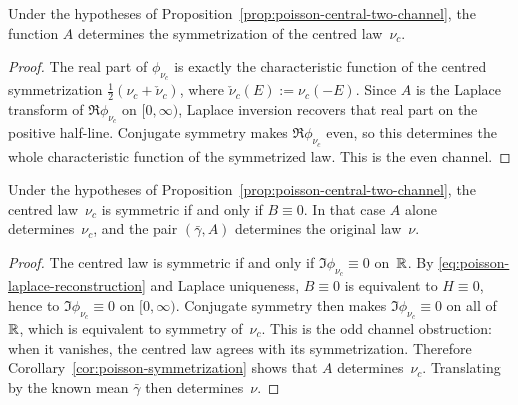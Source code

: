 \begin{corollary}%
\label{cor:poisson-symmetrization}
Under the hypotheses of Proposition~\ref{prop:poisson-central-two-channel}, the
function $A$ determines the symmetrization of the centred law~$\nu_c$.
\end{corollary}

\begin{proof}
The real part of $\phi_{\nu_c}$ is exactly the characteristic function of
the centred symmetrization
$\frac12(\nu_c+\check\nu_c)$, where $\check\nu_c(E):=\nu_c(-E)$.  Since
$A$ is the Laplace transform of $\Re\phi_{\nu_c}$ on $[0,\infty)$, Laplace
inversion recovers that real part on the positive half-line.  Conjugate
symmetry makes $\Re\phi_{\nu_c}$ even, so this determines the whole
characteristic function of the symmetrized law.  This is the even channel.
\end{proof}

\begin{corollary}%
\label{cor:poisson-symmetric-case}
Under the hypotheses of Proposition~\ref{prop:poisson-central-two-channel}, the
centred law~$\nu_c$ is symmetric if and only if $B\equiv 0$.  In that case
$A$ alone determines~$\nu_c$, and the pair $(\bar{\gamma},A)$ determines the
original law~$\nu$.
\end{corollary}

\begin{proof}
The centred law is symmetric if and only if
$\Im\phi_{\nu_c}\equiv 0$ on~$\mathbb{R}$.  By
\eqref{eq:poisson-laplace-reconstruction} and Laplace uniqueness,
\(B\equiv0\) is equivalent to \(H\equiv0\), hence to
\(\Im\phi_{\nu_c}\equiv0\) on \([0,\infty)\).  Conjugate symmetry then makes
\(\Im\phi_{\nu_c}\equiv0\) on all of \(\mathbb{R}\), which is equivalent to
symmetry of~\(\nu_c\).  This is the odd channel obstruction: when it
vanishes, the centred law agrees with its symmetrization.  Therefore
Corollary~\ref{cor:poisson-symmetrization} shows that $A$ determines~$\nu_c$.
Translating by the known mean $\bar{\gamma}$ then determines~$\nu$.
\end{proof}

